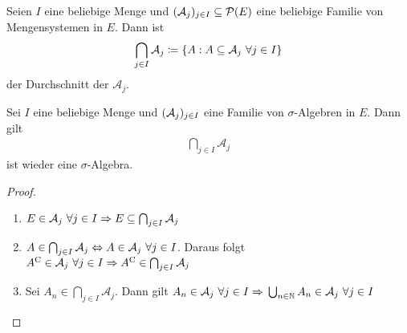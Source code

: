 \begin{notation}[Durchschnitt]
    Seien $I$ eine beliebige Menge und $(\mA_j)_{j\in I} \subseteq\mathcal{P}\of{E}$ eine beliebige Familie von Mengensystemen in $E$. Dann ist
    \begin{align*}
        \bigcap_{j\in I} \mathcal{A}_j \coloneqq \left\{A: A \subseteq \mathcal{A}_j~\forall j\in I\right\}
    \end{align*}
    der Durchschnitt der $\mathcal{A}_j$.
\end{notation}

\begin{satz} %
    \label{satz:schnitt-sig-algebra}
    Sei $I$ eine beliebige Menge und $(\mathcal{A}_j)_{j\in I}$ eine Familie von $\sigma$-Algebren in $E$. Dann gilt
    \begin{align*}
        \bigcap_{j\in I} \mathcal{A}_j
    \end{align*}
    ist wieder eine $\sigma$-Algebra.
    \begin{proof}
        \theoremescape
        \begin{enumerate}[label=($\Sigma_{\arabic*}$)]
            \item $E\in\mathcal{A}_j~\forall j\in I \Rightarrow{} E \subseteq \bigcap_{j\in I} \mathcal{A}_j$
            \item $A \in \bigcap_{j\in I} \mathcal{A}_j \Leftrightarrow{} A \in \mathcal{A}_j~\forall j\in I$. Daraus folgt ${A}^{\mathrm{C}} \in \mathcal{A}_j~\forall j\in I \Rightarrow{} {A}^{\mathrm{C}} \in \bigcap_{j\in I}\mathcal{A}_j$
            \item Sei $A_n \in \bigcap_{j\in I} \mathcal{A}_j$. Dann gilt $A_n \in \mathcal{A}_j~\forall j\in I \Rightarrow{} \bigcup_{n\in\mathbb{N}} A_n \in \mathcal{A}_j~\forall j\in I$\qedhere
        \end{enumerate}
    \end{proof}
\end{satz}

